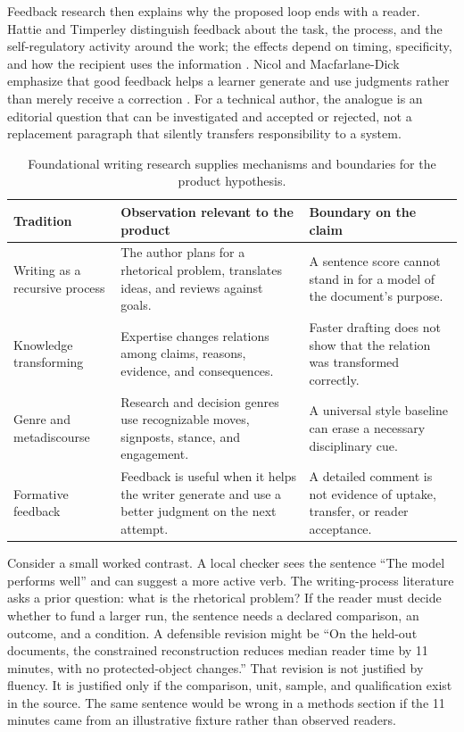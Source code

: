 Feedback research then explains why the proposed loop ends with a reader. Hattie
and Timperley distinguish feedback about the task, the process, and the
self-regulatory activity around the work; the effects depend on timing,
specificity, and how the recipient uses the information
\citep{hattie2007feedback}. Nicol and Macfarlane-Dick emphasize that good
feedback helps a learner generate and use judgments rather than merely receive
a correction \citep{nicol2006formative}. For a technical author, the analogue
is an editorial question that can be investigated and accepted or rejected,
not a replacement paragraph that silently transfers responsibility to a
system.

\begin{table}[H]
\centering
\small
\begin{tabularx}{\textwidth}{@{}p{}L p{0.27\textwidth}@{}}
\toprule
Tradition & Observation relevant to the product & Boundary on the claim \\
\midrule
Writing as a recursive process & The author plans for a rhetorical problem,
translates ideas, and reviews against goals. & A sentence score cannot stand in
for a model of the document's purpose. \\
Knowledge transforming & Expertise changes relations among claims, reasons,
evidence, and consequences. & Faster drafting does not show that the relation
was transformed correctly. \\
Genre and metadiscourse & Research and decision genres use recognizable moves,
signposts, stance, and engagement. & A universal style baseline can erase a
necessary disciplinary cue. \\
Formative feedback & Feedback is useful when it helps the writer generate and
use a better judgment on the next attempt. & A detailed comment is not evidence
of uptake, transfer, or reader acceptance. \\
\bottomrule
\end{tabularx}
\caption{Foundational writing research supplies mechanisms and boundaries for
the product hypothesis.}
\label{tab:writing-foundations}
\end{table}

Consider a small worked contrast. A local checker sees the sentence ``The
model performs well'' and can suggest a more active verb. The writing-process
literature asks a prior question: what is the rhetorical problem? If the
reader must decide whether to fund a larger run, the sentence needs a declared
comparison, an outcome, and a condition. A defensible revision might be
``On the held-out documents, the constrained reconstruction reduces median
reader time by 11 minutes, with no protected-object changes.'' That revision
is not justified by fluency. It is justified only if the comparison, unit,
sample, and qualification exist in the source. The same sentence would be
wrong in a methods section if the 11 minutes came from an illustrative fixture
rather than observed readers.

